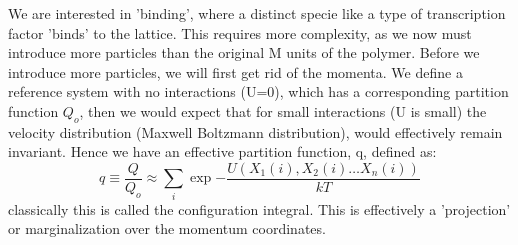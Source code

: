 We are interested in 'binding', where a distinct specie like a type of transcription factor 'binds' to the lattice.  This requires more complexity, as we now must introduce more particles than the original M units of the polymer.  Before we introduce more particles, we will first get rid of the momenta.  We define a reference system with no interactions (U=0), which has a corresponding partition function $Q_o$, then we would expect that for small interactions (U is small) the velocity distribution (Maxwell Boltzmann distribution), would effectively remain invariant.  Hence we have an effective partition function, q, defined as:
\begin{equation}\label{idealgasq}
  q \equiv \frac{Q}{Q_o} \approx \sum_i \exp{-\frac{U(X_1(i), X_2(i)\dotsc X_n(i))}{kT} }
  \end{equation}
classically this is called the configuration integral.  This is effectively a 'projection' or marginalization over the momentum coordinates.